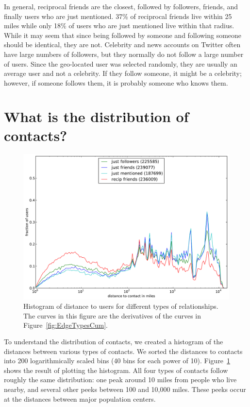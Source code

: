 In general, reciprocal friends are the closest, followed by followers, friends,
and finally users who are just mentioned.
37\% of reciprocal friends live within 25 miles while only 18\% of users
who are just mentioned live within that radius.
While it may seem that since being followed by someone and following someone
should be identical, they are not.
Celebrity and news accounts on Twitter often have large numbers of followers,
but they normally do not follow a large number of users.
Since the geo-located user was selected randomly, they are usually an average
user and not a celebrity.
If they follow someone, it might be a celebrity; however, if someone follows
them, it is probably someone who knows them.

\section{What is the distribution of contacts?}

\begin{figure}[tb]
\centering
\includegraphics[width=\linewidth]{figures/edge_types_norm.pdf}
\caption{
Histogram of distance to users for different types of relationships.
The curves in this figure are the derivatives of the curves in
Figure~\ref{fig:EdgeTypesCum}.
}
\label{fig:EdgeTypes}
\end{figure}

To understand the distribution of contacts, we created a histogram of the distances between various types of contacts.
We sorted the distances to contacts into 200 logarithmically
scaled bins (40 bins for each power of 10).
Figure~\ref{fig:EdgeTypes} shows the result of plotting the histogram.
%
All four types of contacts follow roughly the same
distribution: one peak around 10 miles from people who live nearby, and several
other peeks between 100 and 10,000 miles. These peeks occur at the distances
between major population centers.

